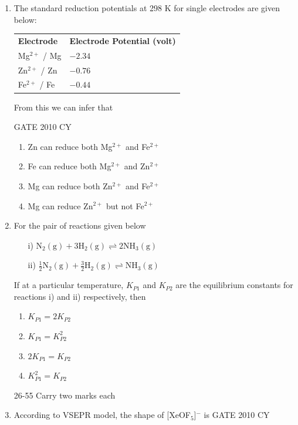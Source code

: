\documentclass[journal,12pt,onecolumn]{IEEEtran}
\theoremstyle{remark}
\begin{document}
\begin{enumerate}
\item The standard reduction potentials at 298 K for single electrodes are given below:\\

\begin{tabular}{l l}
\textbf{Electrode} & \textbf{Electrode Potential (volt)} \\
Mg$^{2+}$ / Mg & $-2.34$ \\
Zn$^{2+}$ / Zn & $-0.76$ \\
Fe$^{2+}$ / Fe & $-0.44$ \\
\end{tabular}

From this we can infer that

\hfill{GATE 2010 CY}

\begin{multicols}{2}
\begin{enumerate}
    \item Zn can reduce both Mg$^{2+}$ and Fe$^{2+}$
    \item Fe can reduce both Mg$^{2+}$ and Zn$^{2+}$
    \item Mg can reduce both Zn$^{2+}$ and Fe$^{2+}$
    \item Mg can reduce Zn$^{2+}$ but not Fe$^{2+}$
\end{enumerate}
\end{multicols}
\item For the pair of reactions given below

\begin{itemize}
    \item[i)] $\mathrm{N_2(g) + 3H_2(g) \rightleftharpoons 2NH_3(g)}$
    \item[ii)] $\mathrm{\frac{1}{2}N_2(g) + \frac{3}{2}H_2(g) \rightleftharpoons NH_3(g)}$
\end{itemize}

If at a particular temperature, $K_{P1}$ and $K_{P2}$ are the equilibrium constants for reactions i) and ii) respectively, then

\begin{multicols}{2}
\begin{enumerate}
    \item $K_{P1} = 2K_{P2}$
    \item $K_{P1} = K_{P2}^2$
    \item $2K_{P1} = K_{P2}$
    \item $K_{P1}^2 = K_{P2}$
\end{enumerate}
\end{multicols}
26-55 Carry two marks each
\item According to VSEPR model, the shape of [XeOF$_5$]$^-$ is
\hfill{GATE 2010 CY}


\end{enumerate}
\end{document}
